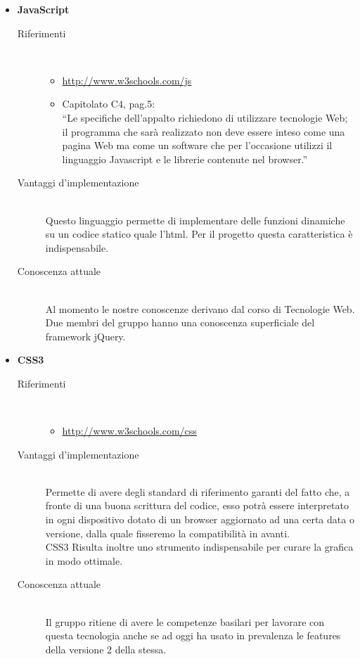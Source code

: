 \begin{itemize}
\begin{description}
	\end{description}
	\item \textbf{JavaScript}
	\begin{description}
		\item[Riferimenti] \hfill \\ 
		\begin{itemize}
			\item \url{http://www.w3schools.com/js}
			\item Capitolato C4, pag.5:\\ “Le specifiche dell'appalto richiedono di utilizzare tecnologie Web; il programma che sarà realizzato non deve essere inteso come una pagina Web ma come un software che per l'occasione utilizzi il linguaggio Javascript e le librerie contenute nel browser.”
		\end{itemize}
		\item[Vantaggi d'implementazione] \hfill \\ Questo linguaggio permette di implementare delle funzioni dinamiche su un codice statico quale l’html. Per il progetto \PROGETTO  questa caratteristica è indispensabile.
		\item[Conoscenza attuale] \hfill \\ Al momento le nostre conoscenze derivano dal corso di Tecnologie Web. \\ Due membri del gruppo hanno una conoscenza superficiale del framework jQuery.
	\end{description}
	\item \textbf{CSS3}
	\begin{description}
		\item[Riferimenti] \hfill \\
		\begin{itemize}
			\item \url{http://www.w3schools.com/css}
		\end{itemize}
		\item[Vantaggi d'implementazione] \hfill \\ Permette di avere degli standard di riferimento garanti del fatto che, a fronte di una buona scrittura del codice, esso potrà essere interpretato in ogni dispositivo dotato di un browser aggiornato ad una certa data o versione, dalla quale fisseremo la compatibilità in avanti. \\ CSS3 Risulta inoltre uno strumento indispensabile per curare la grafica in modo ottimale.
		\item[Conoscenza attuale] \hfill \\ Il gruppo ritiene di avere le competenze basilari per lavorare con questa tecnologia anche se ad oggi ha usato in prevalenza le features della versione 2 della stessa.

\end{description}
\end{itemize}
